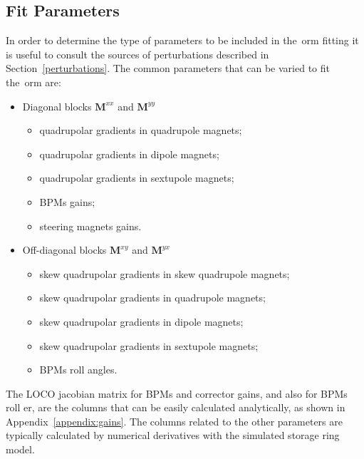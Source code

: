 \subsection{Fit Parameters}\label{subsec:fit_params}
In order to determine the type of parameters to be included in the~\gls{orm} fitting it is useful to consult the sources of perturbations described in Section~\ref{perturbations}. The common parameters that can be varied to fit the~\gls{orm} are:
\begin{itemize}
    \item Diagonal blocks $\mathbf{M}^{xx}$ and $\mathbf{M}^{yy}$
    \begin{itemize}
        \item quadrupolar gradients in quadrupole magnets;
        \item quadrupolar gradients in dipole magnets;
        \item quadrupolar gradients in sextupole magnets;
        \item BPMs gains;
        \item steering magnets gains.
    \end{itemize}
    \item Off-diagonal blocks $\mathbf{M}^{xy}$ and $\mathbf{M}^{yx}$
    \begin{itemize}
        \item skew quadrupolar gradients in skew quadrupole magnets;
        \item skew quadrupolar gradients in quadrupole magnets;
        \item skew quadrupolar gradients in dipole magnets;
        \item skew quadrupolar gradients in sextupole magnets;
        \item BPMs roll angles.
    \end{itemize}
\end{itemize}
The LOCO jacobian matrix for BPMs and corrector gains, and also for BPMs roll er, are the columns that can be easily calculated analytically, as shown in Appendix~\ref{appendix:gains}. The columns related to the other parameters are typically calculated by numerical derivatives with the simulated storage ring model. 

